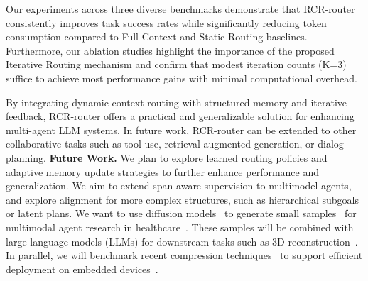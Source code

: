\documentclass[letterpaper]{article} %
\begin{document}
Our experiments across three diverse benchmarks demonstrate that RCR-router consistently improves task success rates while significantly reducing token consumption compared to Full-Context and Static Routing baselines. Furthermore, our ablation studies highlight the importance of the proposed Iterative Routing mechanism and confirm that modest iteration counts (K=3) suffice to achieve most performance gains with minimal computational overhead.

By integrating dynamic context routing with structured memory and iterative feedback, RCR-router offers a practical and generalizable solution for enhancing multi-agent LLM systems. In future work, RCR-router can be extended to other collaborative tasks such as tool use, retrieval-augmented generation, or dialog planning. %
\noindent\textbf{Future Work.}
We plan to explore learned routing policies and adaptive memory update strategies to further enhance performance and generalization.
We aim to extend span-aware supervision to multimodel agents, and explore alignment for more complex structures, such as hierarchical subgoals or latent plans. %
We want to use diffusion models~\cite{meng2024instructgie} to generate small samples~\cite{liu2023interpretable,liu2021explainable,liu2022efficient} for multimodal agent research in healthcare~\cite{chinta2025ai,wang2025fairgnn,liu2024brain,chinta2023optimization,wang2025graph,wang2025amcr}. 
These samples will be combined with large language models (LLMs) for downstream tasks such as 3D reconstruction~\cite{li2025local,lei2023mac,dong2024physical,dong2024df}.
In parallel, we will benchmark recent compression techniques~\cite{10.1609/aaai.v39i18.34078,yang2025fairsmoe,tan2025perturbation,li2025mutual,tan2025harmony} to support efficient deployment on embedded devices~\cite{zhang2025towards,10.1145/3747842,yuan2021work,ji2025computation}.


\clearpage

%

\end{document}
